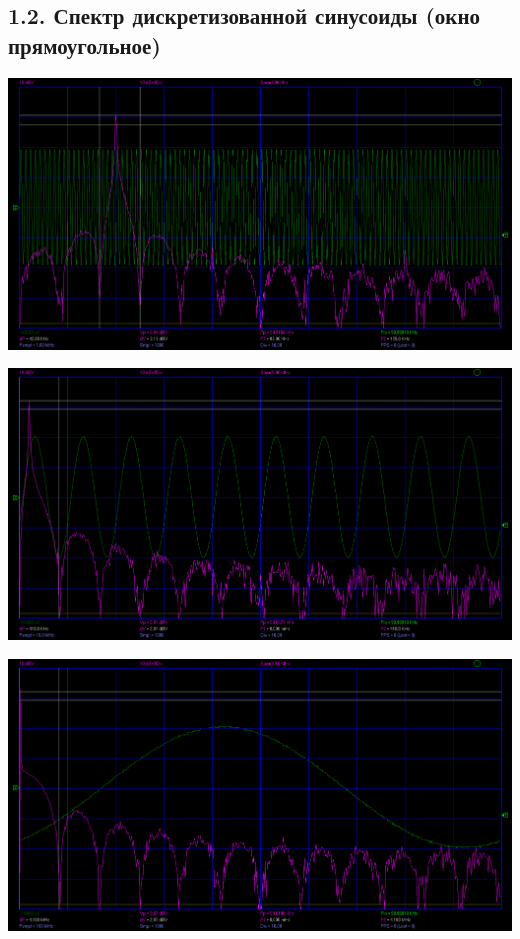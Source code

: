 \documentclass[12pt,a4paper]{article}
\begin{document}
\subsection*{1.2. Спектр дискретизованной синусоиды (окно прямоугольное)}
\vspace*{20pt}

\begin{center}
	\includegraphics[width=.8\linewidth]{data/1-2_rect_1MHZ}\hfill
\end{center}	
\begin{center}
	\includegraphics[width=.8\linewidth]{data/1-2_rect_10MHZ}\hfill
\end{center}	
\begin{center}
	\includegraphics[width=.8\linewidth]{data/1-2_rect_100MHZ}\hfill
\end{center}	
\newpage
\end{document}
